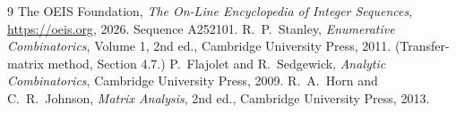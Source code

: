 \documentclass[11pt,a4paper]{article}
\theoremstyle{plain}
\theoremstyle{definition}
\begin{document}
\begin{thebibliography}{9}
 The OEIS Foundation, \emph{The On-Line Encyclopedia of Integer
Sequences}, \url{https://oeis.org}, 2026. Sequence A252101.
 R.~P.~Stanley, \emph{Enumerative Combinatorics}, Volume 1, 2nd ed.,
Cambridge University Press, 2011. (Transfer-matrix method, Section 4.7.)
 P.~Flajolet and R.~Sedgewick, \emph{Analytic Combinatorics}, Cambridge
University Press, 2009.
 R.~A.~Horn and C.~R.~Johnson, \emph{Matrix Analysis}, 2nd ed., Cambridge
University Press, 2013.
\end{thebibliography}
\end{document}
